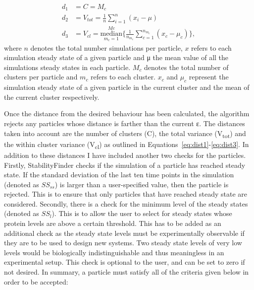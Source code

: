 \begin{align}
	d_1 &= C = M_c \label{eq:dist1}\\
	d_2 &= V_{tot} = \frac{1}{n} \sum_{i=1}^{n}(x_i- \mu)	\label{eq:dist1}\\
	d_3 &= V_{cl} =  \underset{m_c = 1}{\overset{Mc}{\mathrm{median}}} \{ \frac{1}{n_{m_c}} \sum_{c=1}^{n_{m_c}}(x_c- \mu_c)\} \label{eq:dist3},
\end{align}
where $n$ denotes the total number simulations per particle, $x$ refers to each  simulation steady state of a given particle and μ the mean value of all the simulations steady states in each particle. $M_c$ denotes the total number of clusters per particle and $m_c$ refers to each cluster. $x_c$ and $\mu_c$ represent the simulation steady state of a given particle in the current cluster and the mean of the current cluster respectively.   



Once the distance from the desired behaviour has been calculated, the algorithm rejects any particles whose distance is farther than the current ε. The distances taken into account are the number of clusters (C), the total variance (V\textsubscript{tot}) and the within cluster variance (V\textsubscript{cl}) as outlined in Equations~\ref{eq:dist1}-\ref{eq:dist3}. In addition to these distances I have included another two checks for the particles. Firstly, StabilityFinder checks if the simulation of a particle has reached steady state. If the standard deviation of the last ten time points in the simulation (denoted as $SS_{ss}$) is larger than a user-specified value, then the particle is rejected. This is to ensure that only particles that have reached steady state are considered. Secondly, there is a check for the minimum level of the steady states (denoted as $SS_{l}$). This is to allow the user to select for steady states whose protein levels are above a certain threshold. This has to be added as an additional check as the steady state levels must be experimentally observable if they are to be used to design new systems. Two steady state levels of very low levels would be biologically indistinguishable and thus meaningless in an experimental setup. This check is optional to the user, and can be set to zero if not desired. In summary, a particle must satisfy all of the criteria given below in order to be accepted:

